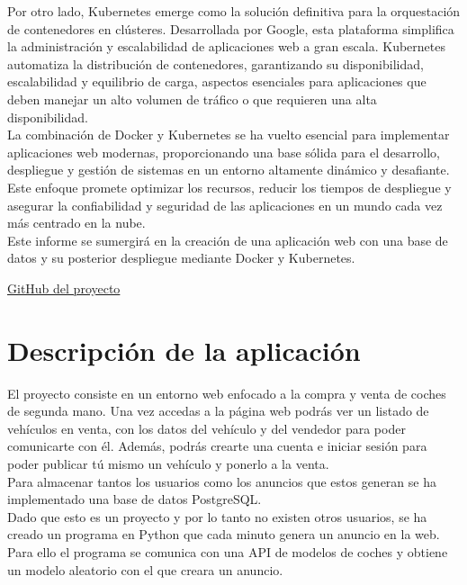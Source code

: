 \documentclass{report}
\begin{document}
        Por otro lado, Kubernetes emerge como la solución definitiva para la orquestación de contenedores en clústeres. Desarrollada por Google, esta plataforma simplifica la administración y escalabilidad de aplicaciones web a gran escala. Kubernetes automatiza la distribución de contenedores, garantizando su disponibilidad, escalabilidad y equilibrio de carga, aspectos esenciales para aplicaciones que deben manejar un alto volumen de tráfico o que requieren una alta disponibilidad.\\
        
        La combinación de Docker y Kubernetes se ha vuelto esencial para implementar aplicaciones web modernas, proporcionando una base sólida para el desarrollo, despliegue y gestión de sistemas en un entorno altamente dinámico y desafiante. Este enfoque promete optimizar los recursos, reducir los tiempos de despliegue y asegurar la confiabilidad y seguridad de las aplicaciones en un mundo cada vez más centrado en la nube.\\
        
        Este informe se sumergirá en la creación de una aplicación web con una base de datos y su posterior despliegue mediante Docker y Kubernetes.

        \vfill
        \begin{center}
            \textcolor{Cyan}{\href{https://github.com/Xabierland/AS-Proyecto}{GitHub del proyecto}}
        \end{center}
    \chapter{Descripción de la aplicación}
        El proyecto consiste en un entorno web enfocado a la compra y venta de coches de segunda mano.
        Una vez accedas a la página web podrás ver un listado de vehículos en venta, con los datos del vehículo y del vendedor para poder comunicarte con él.
        Además, podrás crearte una cuenta e iniciar sesión para poder publicar tú mismo un vehículo y ponerlo a la venta.\\

        Para almacenar tantos los usuarios como los anuncios que estos generan se ha implementado una base de datos PostgreSQL.\\

        Dado que esto es un proyecto y por lo tanto no existen otros usuarios, se ha creado un programa en Python que cada minuto genera un anuncio en la web.
        Para ello el programa se comunica con una API de modelos de coches y obtiene un modelo aleatorio con el que creara un anuncio.\\
\end{document}
